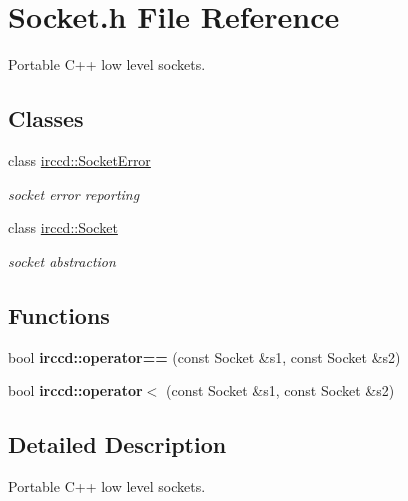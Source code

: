 \hypertarget{a00139}{\section{Socket.\-h File Reference}
\label{a00139}
}


Portable C++ low level sockets.  


\subsection*{Classes}
\begin{DoxyCompactItemize}
\item 
class \hyperlink{a00064}{irccd\-::\-Socket\-Error}
\begin{DoxyCompactList}\small\item\em socket error reporting \end{DoxyCompactList}\item 
class \hyperlink{a00062}{irccd\-::\-Socket}
\begin{DoxyCompactList}\small\item\em socket abstraction \end{DoxyCompactList}\end{DoxyCompactItemize}
\subsection*{Functions}
\begin{DoxyCompactItemize}
\item 
bool {\bfseries irccd\-::operator==} (const Socket \&s1, const Socket \&s2)
\item 
bool {\bfseries irccd\-::operator$<$} (const Socket \&s1, const Socket \&s2)
\end{DoxyCompactItemize}


\subsection{Detailed Description}
Portable C++ low level sockets. 